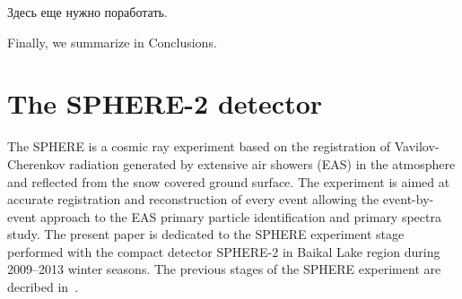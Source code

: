 \documentclass[final,5p,times,twocolumn]{elsarticle}
\begin{document}


{\Russian
Здесь еще нужно поработать.
}

Finally, we summarize in Conclusions.

\section{The SPHERE-2 detector \label{sect:detector}}
The SPHERE is a cosmic ray experiment based on the registration of Vavilov-Cherenkov radiation generated by extensive air showers (EAS) in the atmosphere and reflected from the snow covered ground surface. The experiment is aimed at accurate registration and reconstruction of every event allowing the event-by-event approach to the EAS primary particle identification and primary spectra study. The present paper is dedicated to the SPHERE experiment stage performed with the compact detector SPHERE-2 in Baikal Lake region during 2009--2013 winter seasons. The previous stages of the SPHERE experiment are decribed in~\cite{ant15a}.
\end{document}

